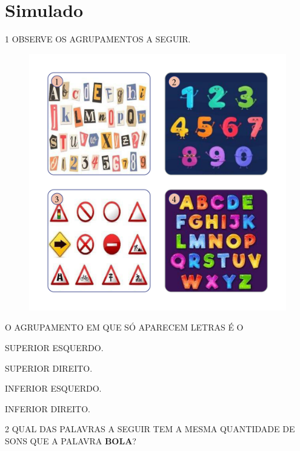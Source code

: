 \setcounter{chapter}{0}
\chapter[Simulado 1]{Simulado}

\num{1} OBSERVE OS AGRUPAMENTOS A SEGUIR.

\begin{figure}[H]
\includegraphics[width=\textwidth]{media/image183a186}
\end{figure}

O AGRUPAMENTO EM QUE SÓ APARECEM LETRAS É O

\begin{escolha}
\item SUPERIOR ESQUERDO.

\item SUPERIOR DIREITO.

\item INFERIOR ESQUERDO.

\item INFERIOR DIREITO.
\end{escolha}

\pagebreak

\num{2} QUAL DAS PALAVRAS A SEGUIR TEM A MESMA QUANTIDADE DE SONS QUE A PALAVRA \textbf{BOLA}?

